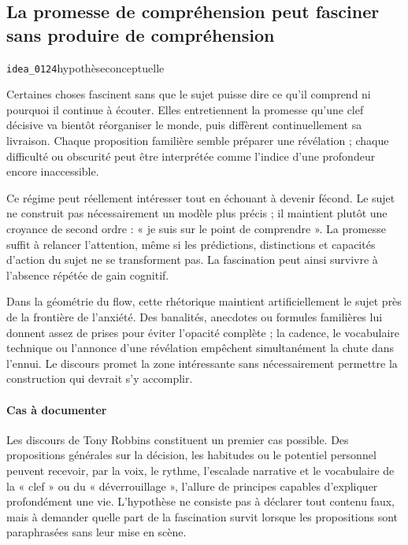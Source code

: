 \documentclass[10pt,a4paper]{article}
\begin{document}
\subsection{La promesse de compréhension peut fasciner sans produire de compréhension}
{\small\color{metadata} \texttt{idea\_0124}\quad\textbullet\quad hypothèse\quad\textbullet\quad conceptuelle\par}

Certaines choses fascinent sans que le sujet puisse dire ce qu'il comprend ni pourquoi il continue à écouter. Elles entretiennent la promesse qu'une clef décisive va bientôt réorganiser le monde, puis diffèrent continuellement sa livraison. Chaque proposition familière semble préparer une révélation ; chaque difficulté ou obscurité peut être interprétée comme l'indice d'une profondeur encore inaccessible.

Ce régime peut réellement intéresser tout en échouant à devenir fécond. Le sujet ne construit pas nécessairement un modèle plus précis ; il maintient plutôt une croyance de second ordre : « je suis sur le point de comprendre ». La promesse suffit à relancer l'attention, même si les prédictions, distinctions et capacités d'action du sujet ne se transforment pas. La fascination peut ainsi survivre à l'absence répétée de gain cognitif.

Dans la géométrie du flow, cette rhétorique maintient artificiellement le sujet près de la frontière de l'anxiété. Des banalités, anecdotes ou formules familières lui donnent assez de prises pour éviter l'opacité complète ; la cadence, le vocabulaire technique ou l'annonce d'une révélation empêchent simultanément la chute dans l'ennui. Le discours promet la zone intéressante sans nécessairement permettre la construction qui devrait s'y accomplir.

\paragraph{Cas à documenter}
Les discours de Tony Robbins constituent un premier cas possible. Des propositions générales sur la décision, les habitudes ou le potentiel personnel peuvent recevoir, par la voix, le rythme, l'escalade narrative et le vocabulaire de la « clef » ou du « déverrouillage », l'allure de principes capables d'expliquer profondément une vie. L'hypothèse ne consiste pas à déclarer tout contenu faux, mais à demander quelle part de la fascination survit lorsque les propositions sont paraphrasées sans leur mise en scène.
\end{document}
